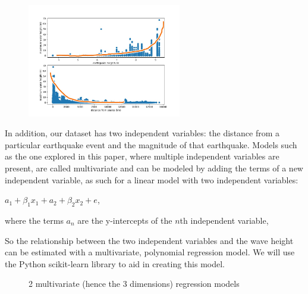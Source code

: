 \documentclass[11pt,letterpaper]{article}
\begin{document}
\begin{figure}[h]
    \centering
    \includegraphics[width=0.6\textwidth]{modelshowcase.jpeg}
    \label{fig:boat1}
\end{figure}

In addition, our dataset has two independent variables: the distance from a particular
earthquake event and the magnitude of that earthquake. Models such as the one explored 
in this paper, where multiple independent variables are present, are called multivariate 
and can be modeled by adding the terms of a new independent variable, as such 
for a linear model with two independent variables:

$a_1 + \beta_1 x_1 + a_2 + \beta_2 x_2 + e$, 

where the terms $a_n$ are the y-intercepts of the $n$th independent variable, 


So the relationship between the two independent variables and the wave height can
be estimated with a multivariate, polynomial regression model. We will use the Python
scikit-learn library to aid in creating this model.

\begin{figure}[h]
    \centering
    \qquad
    \caption{2 multivariate (hence the 3 dimensions) regression models}
    \label{fig:example}
\end{figure}
\end{document}
